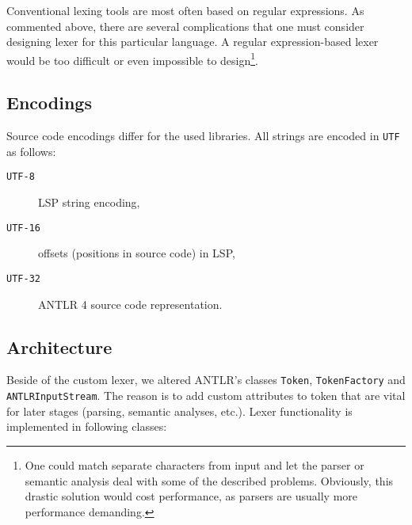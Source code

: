 Conventional lexing tools are most often based on regular expressions. As commented above, there are several complications that one must consider designing lexer for this particular language. A regular expression-based lexer would be too difficult or even impossible to design\footnote{One could match separate characters from input and let the parser or semantic analysis deal with some of the described problems. Obviously, this drastic solution would cost performance, as parsers are usually more performance demanding.}.

\subsection{Encodings}
Source code encodings differ for the used libraries. All strings are encoded in \texttt{UTF} as follows:

\begin{description}
	\item[\texttt{UTF-8}] LSP string encoding,
	\item[\texttt{UTF-16}] offsets (positions in source code) in LSP,
	\item[\texttt{UTF-32}] ANTLR 4 source code representation.
\end{description}

\subsection{Architecture}
Beside of the custom lexer, we altered ANTLR's classes \texttt{Token}, \texttt{TokenFactory} and \texttt{ANTLRInputStream}. The reason is to add custom attributes to token that are vital for later stages (parsing, semantic analyses, etc.). Lexer functionality is implemented in following classes:

